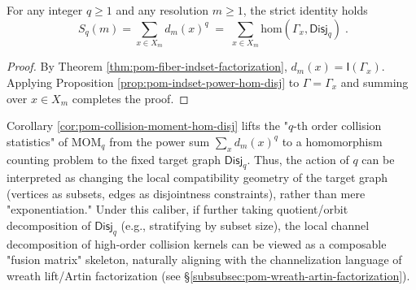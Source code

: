 \begin{corollary}\label{cor:pom-collision-moment-hom-disj}
For any integer \(q\ge 1\) and any resolution \(m\ge 1\), the strict identity holds
\[
\boxed{\;
S_q(m)=\sum_{x\in X_m} d_m(x)^q
\;=\;
\sum_{x\in X_m}\mathrm{hom}(\Gamma_x,\mathsf{Disj}_q)\; }.
\]
\end{corollary}
\begin{proof}
By Theorem \ref{thm:pom-fiber-indset-factorization}, \(d_m(x)=\mathsf{I}(\Gamma_x)\).
Applying Proposition \ref{prop:pom-indset-power-hom-disj} to \(\Gamma=\Gamma_x\) and summing over \(x\in X_m\) completes the proof.
\end{proof}

\begin{remark}\label{rem:pom-disj-target-graph-fusion}
Corollary \ref{cor:pom-collision-moment-hom-disj} lifts the "\(q\)-th order collision statistics" of \(\mathrm{MOM}_q\) from the power sum \(\sum_x d_m(x)^q\) to a homomorphism counting problem to the fixed target graph \(\mathsf{Disj}_q\).
Thus, the action of \(q\) can be interpreted as changing the local compatibility geometry of the target graph (vertices as subsets, edges as disjointness constraints), rather than mere "exponentiation."
Under this caliber, if further taking quotient/orbit decomposition of \(\mathsf{Disj}_q\) (e.g., stratifying by subset size), the local channel decomposition of high-order collision kernels can be viewed as a composable "fusion matrix" skeleton, naturally aligning with the channelization language of wreath lift/Artin factorization (see \S\ref{subsubsec:pom-wreath-artin-factorization}).
\end{remark}

